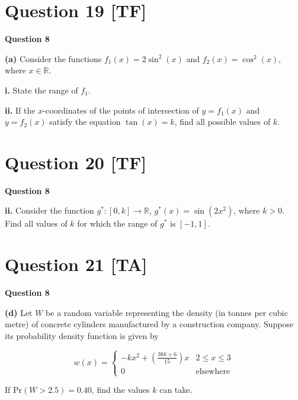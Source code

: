 \documentclass[10pt,a4paper]{article}
\begin{document}
\section*{Question 19 [TF]}

\textbf{Question 8}

\textbf{(a)} Consider the functions $f_1(x) = 2\sin^2(x)$ and $f_2(x) = \cos^2(x)$, where $x \in \mathbb{R}$.

\textbf{i.} State the range of $f_1$.

\vspace{9\baselineskip}

\textbf{ii.} If the $x$-coordinates of the points of intersection of $y = f_1(x)$ and $y = f_2(x)$ satisfy the equation $\tan(x) = k$, find all possible values of $k$.

\vspace{9\baselineskip}

\hrulefill

\section*{Question 20 [TF]}

\textbf{Question 8}

\textbf{ii.} Consider the function $g^* : [0,k] \to \mathbb{R}$, $g^*(x) = \sin(2x^2)$, where $k > 0$. Find all values of $k$ for which the range of $g^*$ is $[-1,1]$.

\vspace{9\baselineskip}

\hrulefill

\section*{Question 21 [TA]}

\textbf{Question 8}

\textbf{(d)} Let $W$ be a random variable representing the density (in tonnes per cubic metre) of concrete cylinders manufactured by a construction company. Suppose its probability density function is given by

\[
w(x) = \begin{cases}
-kx^2 + \left(\frac{38k + 6}{15}\right)x & 2 \leq x \leq 3\\
0 & \text{elsewhere}
\end{cases}
\]

If $\text{Pr}(W > 2.5) = 0.40$, find the values $k$ can take.

\vspace{9\baselineskip}
\end{document}
